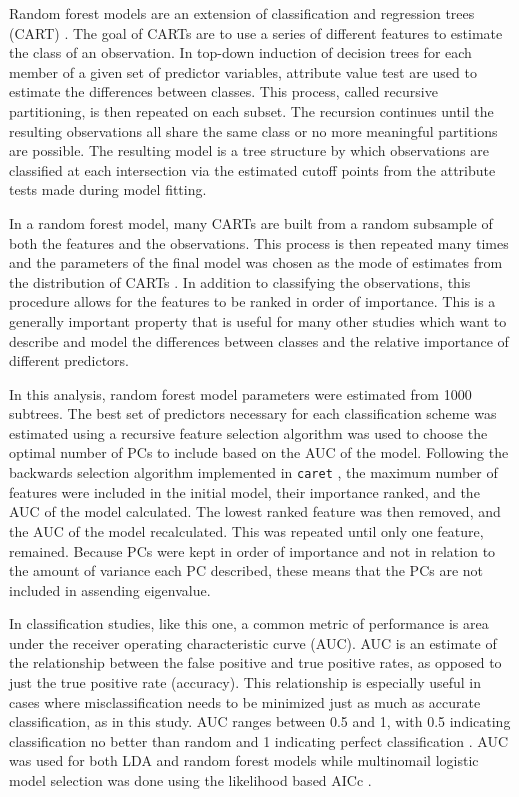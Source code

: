 \documentclass[12pt,letterpaper]{article}
\begin{document}
Random forest models are an extension of classification and regression trees (CART) \citep{Breiman1984,Breiman2001}. The goal of CARTs are to use a series of different features to estimate the class of an observation. In top-down induction of decision trees for each member of a given set of predictor variables, attribute value test are used to estimate the differences between classes. This process, called recursive partitioning, is then repeated on each subset. The recursion continues until the resulting observations all share the same class or no more meaningful partitions are possible. The resulting model is a tree structure by which observations are classified at each intersection via the estimated cutoff points from the attribute tests made during model fitting.

In a random forest model, many CARTs are built from a random subsample of both the features and the observations. This process is then repeated many times and the parameters of the final model was chosen as the mode of estimates from the distribution of CARTs \citep{Breiman2001}. In addition to classifying the observations, this procedure allows for the features to be ranked in order of importance. This is a generally important property that is useful for many other studies which want to describe and model the differences between classes and the relative importance of different predictors. 

In this analysis, random forest model parameters were estimated from 1000 subtrees. The best set of predictors necessary for each classification scheme was estimated using a recursive feature selection algorithm was used to choose the optimal number of PCs to include based on the AUC of the model. Following the backwards selection algorithm implemented in \texttt{caret} \citep{Kuhn2013}, the maximum number of features were included in the initial model, their importance ranked, and the AUC of the model calculated. The lowest ranked feature was then removed, and the AUC of the model recalculated. This was repeated until only one feature, remained. Because PCs were kept in order of importance and not in relation to the amount of variance each PC described, these means that the PCs are not included in assending eigenvalue.

In classification studies, like this one, a common metric of performance is area under the receiver operating characteristic curve (AUC). AUC is an estimate of the relationship between the false positive and true positive rates, as opposed to just the true positive rate (accuracy). This relationship is especially useful in cases where misclassification needs to be minimized just as much as accurate classification, as in this study. AUC ranges between 0.5 and 1, with 0.5 indicating classification no better than random and 1 indicating perfect classification \citep{Hastie2009}. AUC was used for both LDA and random forest models while multinomail logistic model selection was done using the likelihood based AICc \citep{Burnham2002a}.
\end{document}
